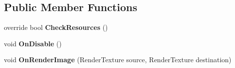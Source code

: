 \subsection*{Public Member Functions}
\begin{DoxyCompactItemize}
\item 
override bool {\bfseries Check\+Resources} ()\hypertarget{class_unity_standard_assets_1_1_image_effects_1_1_blur_optimized_a5d4870a78379d6dd5d74afcf5dbd79e5}{}\label{class_unity_standard_assets_1_1_image_effects_1_1_blur_optimized_a5d4870a78379d6dd5d74afcf5dbd79e5}

\item 
void {\bfseries On\+Disable} ()\hypertarget{class_unity_standard_assets_1_1_image_effects_1_1_blur_optimized_acf5c55ca6e567831664893b623c5d446}{}\label{class_unity_standard_assets_1_1_image_effects_1_1_blur_optimized_acf5c55ca6e567831664893b623c5d446}

\item 
void {\bfseries On\+Render\+Image} (Render\+Texture source, Render\+Texture destination)\hypertarget{class_unity_standard_assets_1_1_image_effects_1_1_blur_optimized_abec08a4c7ce57545389426ca41a6491d}{}\label{class_unity_standard_assets_1_1_image_effects_1_1_blur_optimized_abec08a4c7ce57545389426ca41a6491d}

\end{DoxyCompactItemize}
